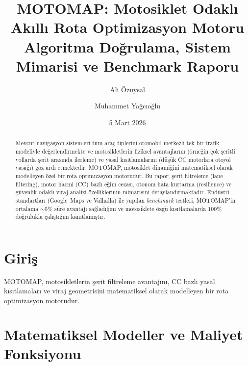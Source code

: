 \documentclass[11pt,a4paper]{article}
\title{\textbf{MOTOMAP: Motosiklet Odakl{\i} Ak{\i}ll{\i} Rota
       Optimizasyon Motoru}\\[6pt]
       \large Algoritma Do\u{g}rulama, Sistem Mimarisi ve
              Benchmark Raporu}
\author{Ali \"Ozuysal \and Muhammet Ya\u{g}c{\i}o\u{g}lu}
\date{5 Mart 2026}
\theoremstyle{definition}
\begin{document}
\maketitle

\begin{abstract}
Mevcut navigasyon sistemleri t\"um ara\c{c} tiplerini otomobil merkezli
tek bir trafik modeliyle de\u{g}erlendirmekte ve motosikletlerin fiziksel
avantajlar{\i}n{\i} (\"orne\u{g}in \c{c}ok \c{s}eritli yollarda \c{s}erit
aras{\i}nda ilerleme) ve yasal k{\i}s{\i}tlamalar{\i}n{\i}
(d\"u\c{s}\"uk CC motorlara otoyol yasa\u{g}{\i}) g\"oz ard{\i}
etmektedir. MOTOMAP, motosiklet dinami\u{g}ini matematiksel olarak
modelleyen \"ozel bir rota optimizasyon motorudur. Bu rapor; \c{s}erit
filtreleme (lane filtering), motor hacmi (CC) bazl{\i} e\u{g}im cezas{\i},
otonom hata kurtarma (resilience) ve g\"uvenlik odakl{\i} viraj analizi
\"ozelliklerinin mimarisini detayland{\i}rmaktad{\i}r.
End\"ustri standartlar{\i} (Google~Maps ve Valhalla) ile yap{\i}lan
\emph{benchmark} testleri, MOTOMAP'in ortalama $\mathord{\sim}\!5\%$
s\"ure avantaj{\i} sa\u{g}lad{\i}\u{g}{\i}n{\i} ve motosiklete \"ozg\"u
k{\i}s{\i}tlamalarda $100\%$ do\u{g}rulukla \c{c}al{\i}\c{s}t{\i}\u{g}{\i}n{\i}
kan{\i}tlam{\i}\c{s}t{\i}r.
\end{abstract}

\tableofcontents
\newpage

\section{Giri\c{s}}\label{sec:intro}

MOTOMAP, motosikletlerin \c{s}erit filtreleme avantaj{\i}n{\i},
CC bazl{\i} yasal k{\i}s{\i}tlamalar{\i} ve viraj geometrisini
matematiksel olarak modelleyen bir rota optimizasyon motorudur.

\section{Matematiksel Modeller ve Maliyet Fonksiyonu}\label{sec:math}
\end{document}
